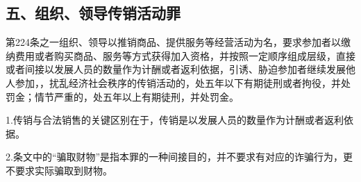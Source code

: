 \subsection*{五、组织、领导传销活动罪}

第224条之一组织、领导以推销商品、提供服务等经营活动为名，要求参加者以缴纳费用或者购买商品、服务等方式获得加入资格，并按照一定顺序组成层级，直接或者间接以发展人员的数量作为计酬或者返利依据，引诱、胁迫参加者继续发展他人参加，，扰乱经济社会秩序的传销活动的，处五年以下有期徒刑或者拘役，并处罚金；情节严重的，处五年以上有期徒刑，并处罚金。

1.传销与合法销售的关键区别在于，传销是以发展人员的数量作为计酬或者返利依据。

2.条文中的“骗取财物”是指本罪的一种间接目的，并不要求有对应的诈骗行为，更不要求实际骗取到财物。
